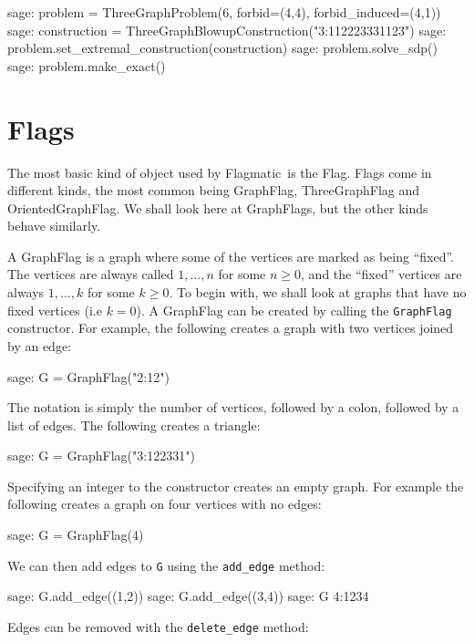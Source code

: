 \documentclass{article}
\providecommand{\flagmatic}{Flagmatic}
\begin{document}
\begin{sage}
sage: problem = ThreeGraphProblem(6, forbid=(4,4), forbid_induced=(4,1))
sage: construction = ThreeGraphBlowupConstruction("3:112223331123")
sage: problem.set_extremal_construction(construction)
sage: problem.solve_sdp()
sage: problem.make_exact()
\end{sage}


\section{Flags}

The most basic kind of object used by \flagmatic\ is the Flag. Flags come in different kinds, the most common being GraphFlag, ThreeGraphFlag and OrientedGraphFlag. We shall look here at GraphFlags, but the other kinds behave similarly.

A GraphFlag is a graph where some of the vertices are marked as being ``fixed''. The vertices are always called $1, \dots, n$ for some $n \ge 0$, and the ``fixed'' vertices are always $1, \dots, k$ for some $k \ge 0$. To begin with, we shall look at graphs that have no fixed vertices (i.{e} $k=0$). A GraphFlag can be created by calling the \verb|GraphFlag| constructor. For example, the following creates a graph with two vertices joined by an edge:

\begin{sage}
sage: G = GraphFlag("2:12")
\end{sage}

The notation is simply the number of vertices, followed by a colon, followed by a list of edges. The following creates a triangle:

\begin{sage}
sage: G = GraphFlag("3:122331")
\end{sage}

Specifying an integer to the constructor creates an empty graph. For example the following 
creates a graph on four vertices with no edges:

\begin{sage}
sage: G = GraphFlag(4)
\end{sage}

We can then add edges to \verb|G| using the \verb|add_edge| method:

\begin{sage}
sage: G.add_edge((1,2))
sage: G.add_edge((3,4))
sage: G
4:1234
\end{sage}

Edges can be removed with the \verb|delete_edge| method:
\end{document}
